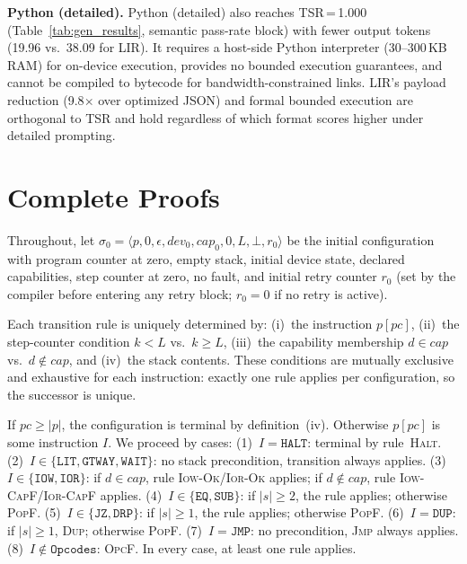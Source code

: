 \documentclass[a4paper,fleqn,longmktitle]{cas-dc}
\begin{document}
\noindent\textbf{Python (detailed).} Python (detailed) also reaches TSR\,=\,1.000 (Table~\ref{tab:gen_results}, semantic pass-rate block) with fewer output tokens (19.96 vs.\ 38.09 for LIR). It requires a host-side Python interpreter (30--300\,KB RAM) for on-device execution, provides no bounded execution guarantees, and cannot be compiled to bytecode for bandwidth-constrained links. LIR's payload reduction (9.8$\times$ over optimized JSON) and formal bounded execution are orthogonal to TSR and hold regardless of which format scores higher under detailed prompting.

\section{Complete Proofs}
\label{app:proofs}

Throughout, let $\sigma_0 = \langle p, 0, \epsilon, \mathit{dev}_0, \mathit{cap}_0, 0, L, \bot, r_0 \rangle$ be the initial configuration with program counter at zero, empty stack, initial device state, declared capabilities, step counter at zero, no fault, and initial retry counter $r_0$ (set by the compiler before entering any retry block; $r_0 = 0$ if no retry is active).

\begin{pf}
Each transition rule is uniquely determined by: (i)~the instruction $p[pc]$, (ii)~the step-counter condition $k < L$ vs.\ $k \geq L$, (iii)~the capability membership $d \in \mathit{cap}$ vs.\ $d \notin \mathit{cap}$, and (iv)~the stack contents. These conditions are mutually exclusive and exhaustive for each instruction: exactly one rule applies per configuration, so the successor is unique.
\end{pf}

\begin{pf}
If $pc \geq |p|$, the configuration is terminal by definition~(iv). Otherwise $p[pc]$ is some instruction $I$. We proceed by cases: (1)~$I = \texttt{HALT}$: terminal by rule~\textsc{Halt}. (2)~$I \in \{\texttt{LIT}, \texttt{GTWAY}, \texttt{WAIT}\}$: no stack precondition, transition always applies. (3)~$I \in \{\texttt{IOW}, \texttt{IOR}\}$: if $d \in \mathit{cap}$, rule \textsc{Iow-Ok}/\textsc{Ior-Ok} applies; if $d \notin \mathit{cap}$, rule \textsc{Iow-CapF}/\textsc{Ior-CapF} applies. (4)~$I \in \{\texttt{EQ}, \texttt{SUB}\}$: if $|s| \geq 2$, the rule applies; otherwise \textsc{PopF}. (5)~$I \in \{\texttt{JZ}, \texttt{DRP}\}$: if $|s| \geq 1$, the rule applies; otherwise \textsc{PopF}. (6)~$I = \texttt{DUP}$: if $|s| \geq 1$, \textsc{Dup}; otherwise \textsc{PopF}. (7)~$I = \texttt{JMP}$: no precondition, \textsc{Jmp} always applies. (8)~$I \notin \texttt{Opcodes}$: \textsc{OpcF}. In every case, at least one rule applies.
\end{pf}
\end{document}
